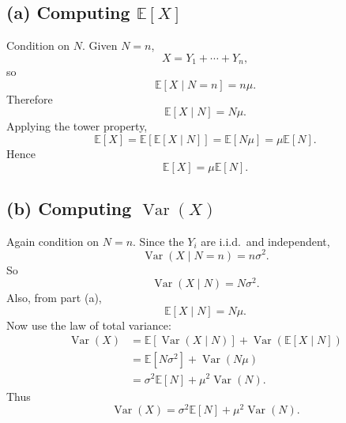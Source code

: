 \documentclass[11pt,a4paper]{article}
\newcommand{\E}{\mathbb{E}}
\newcommand{\Var}{\operatorname{Var}}
\newcommand{\1}{\mathbf{1}}
\begin{document}
\subsection*{(a) Computing $\E[X]$}
Condition on $N$. Given $N=n$,
\[
X=Y_1+\cdots+Y_n,
\]
so
\[
\E[X\mid N=n]=n\mu.
\]
Therefore
\[
\E[X\mid N]=N\mu.
\]
Applying the tower property,
\[
\E[X]=\E[\E[X\mid N]]=\E[N\mu]=\mu \E[N].
\]
Hence
\[
\boxed{\E[X]=\mu \E[N].}
\]

\subsection*{(b) Computing $\Var(X)$}
Again condition on $N=n$. Since the $Y_i$ are i.i.d.\ and independent,
\[
\Var(X\mid N=n)=n\sigma^2.
\]
So
\[
\Var(X\mid N)=N\sigma^2.
\]
Also, from part (a),
\[
\E[X\mid N]=N\mu.
\]
Now use the law of total variance:
\begin{align*}
\Var(X)
&=\E[\Var(X\mid N)]+\Var(\E[X\mid N])\\
&=\E[N\sigma^2]+\Var(N\mu)\\
&=\sigma^2 \E[N]+\mu^2\Var(N).
\end{align*}
Thus
\[
\boxed{\Var(X)=\sigma^2 \E[N]+\mu^2\Var(N).}
\]
\end{document}
